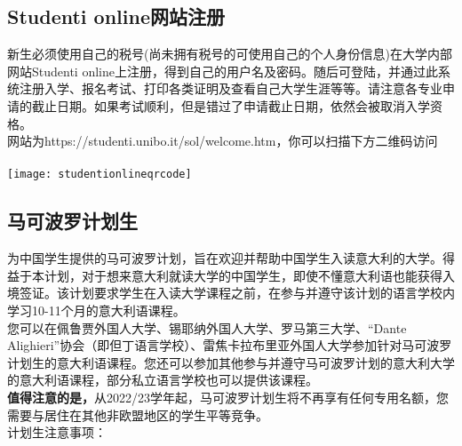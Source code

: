 \subsection{Studenti online网站注册}
新生必须使用自己的税号(尚未拥有税号的可使用自己的个人身份信息)在大学内部网站Studenti online上注册，得到自己的用户名及密码。随后可登陆，并通过此系统注册入学、报名考试、打印各类证明及查看自己大学生涯等等。请注意各专业申请的截止日期。如果考试顺利，但是错过了申请截止日期，依然会被取消入学资格。\\
网站为https://studenti.unibo.it/sol/welcome.htm，你可以扫描下方二维码访问\\
\\
\texttt{[image: studentionlineqrcode]}\\


\subsection{马可波罗计划生}
为中国学生提供的马可波罗计划，旨在欢迎并帮助中国学生入读意大利的大学。得益于本计划，对于想来意大利就读大学的中国学生，即使不懂意大利语也能获得入境签证。该计划要求学生在入读大学课程之前，在参与并遵守该计划的语言学校内学习10-11个月的意大利语课程。\\
您可以在佩鲁贾外国人大学、锡耶纳外国人大学、罗马第三大学、“Dante Alighieri”协会（即但丁语言学校）、雷焦卡拉布里亚外国人大学参加针对马可波罗计划生的意大利语课程。您还可以参加其他参与并遵守马可波罗计划的意大利大学的意大利语课程，部分私立语言学校也可以提供该课程。\\
\textbf{值得注意的是，}从2022/23学年起，马可波罗计划生将不再享有任何专用名额，您需要与居住在其他非欧盟地区的学生平等竞争。\\
计划生注意事项：
